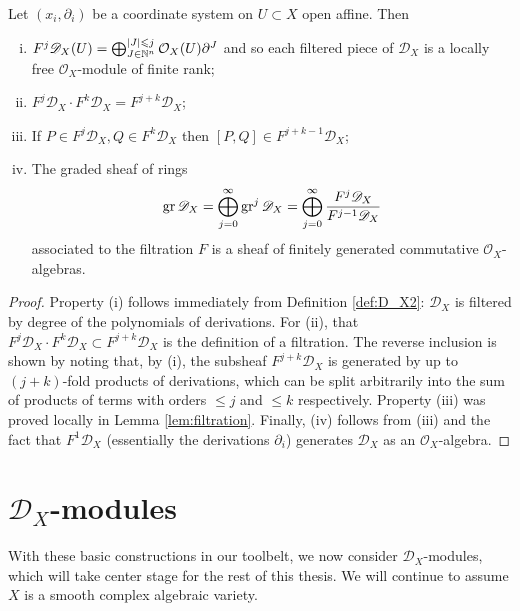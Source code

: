 \begin{proposition}
    Let $(x_i, \partial_i)$ be a coordinate system on $U\subset X$ open affine.
    Then
    \begin{enumerate}[(i)]
        \item $F^j\mathscr{D}_X(U)=\bigoplus_{J\in\mathbb{N}^n}^{|J|\leqslant j}\mathcal{O}_X(U)\partial^J$ and so
            each filtered piece of $\mathscr{D}_X$ is a locally free $\mathcal{O}_X$-module of finite rank;
        \item $F^j\mathscr{D}_X\cdot F^k\mathscr{D}_X=F^{j+k}\mathscr{D}_X$;
        \item If $P\in F^j\mathscr{D}_X, Q\in F^k\mathscr{D}_X$ then $[P,Q]\in F^{j+k-1}\mathscr{D}_X$;
        \item The graded sheaf of rings 
            \[\operatorname{gr}\mathscr{D}_X = \bigoplus_{j=0}^\infty\operatorname{gr}^j\mathscr{D}_X = \bigoplus_{j=0}^\infty\frac{F^j\mathscr{D}_X}{F^{j-1}\mathscr{D}_X}\]
            associated to the filtration $F$ is a sheaf of finitely generated commutative $\mathcal{O}_X$-algebras.
    \end{enumerate}
\end{proposition}
\begin{proof}
    Property (i) follows immediately from Definition \ref{def:D_X2}: $\mathscr{D}_X$ is filtered
    by degree of the polynomials of derivations. 
    For (ii), that $F^j\mathscr{D}_X\cdot F^k\mathscr{D}_X\subset F^{j+k}\mathscr{D}_X$ is the definition
    of a filtration. The reverse inclusion is shown by noting that, by (i), the subsheaf $F^{j+k}\mathscr{D}_X$ is
    generated by up to $(j+k)$-fold products of derivations, which can be split arbitrarily into the
    sum of products of terms with orders $\leqslant j$ and $\leqslant k$ respectively.
    Property (iii) was proved locally in Lemma \ref{lem:filtration}.
    Finally, (iv) follows from (iii) and the fact that $F^1\mathscr{D}_X$ (essentially the derivations
    $\partial_i$) generates $\mathscr{D}_X$ as an $\mathcal{O}_X$-algebra.
\end{proof}


\section{$\mathscr{D}_X$-modules}

With these basic constructions in our toolbelt, we now consider $\mathscr{D}_X$-modules,
which will take center stage for the rest of this thesis. We will continue to assume $X$
is a smooth complex algebraic variety.

